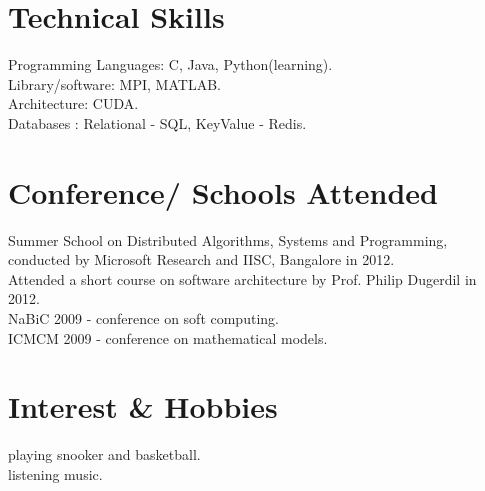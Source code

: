\documentclass[margin,line]{resume}
\begin{document}
\begin{resume}
    \section{\mysidestyle Technical \quad Skills} 
	Programming Languages: C, Java, Python(learning).\\
	Library/software: MPI, MATLAB. \\
	Architecture: CUDA. \\
	Databases : Relational - SQL, KeyValue - Redis. \\
    \section{\mysidestyle Conference/ Schools Attended}
    Summer School on Distributed Algorithms, Systems and Programming, conducted by Microsoft Research and IISC, Bangalore in 2012. \\
    Attended a short course on software architecture by Prof. Philip Dugerdil in 2012. \\
    NaBiC 2009 - conference on soft computing. \\
    ICMCM 2009 - conference on mathematical models. \\

    \section{\mysidestyle Interest \& Hobbies}
    playing snooker and basketball.\\
    listening music.\\ 

\end{resume}
\end{document}
